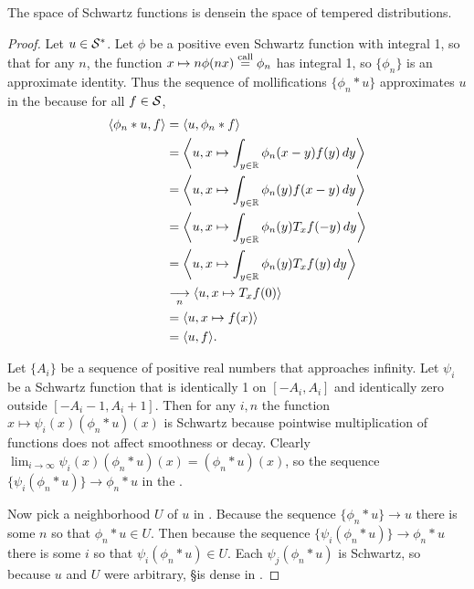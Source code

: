     \begin{thm}
      \label{thm:sdenseinss}
      The space of Schwartz functions is dense\footnotemark in the space of tempered distributions.
    \end{thm}
    \begin{proof}
      Let $u\in\SS$.
      Let $\phi$ be a positive even Schwartz function with integral 1, so that for any $n$, the function $x\mapsto n\phi(nx) \call \phi_n$ has integral 1, so $\{\phi_n\}$ is an approximate identity.
      Thus the sequence of mollifications $\{\phi_n*u\}$ approximates $u$ in the \ws because for all $f\in\S$, 
      \begin{align*}
        \langle \phi_n*u, f\rangle
        &= \langle u, \phi_n*f\rangle
        \\&= \left\langle u, x\mapsto \int_{y\in\R} \phi_n(x-y)f(y)\,dy \right\rangle
        \\&= \left\langle u, x\mapsto \int_{y\in\R} \phi_n(y)f(x-y)\,dy \right\rangle
        \\&= \left\langle u, x\mapsto \int_{y\in\R} \phi_n(y)T_xf(-y)\,dy \right\rangle
        \\&= \left\langle u, x\mapsto \int_{y\in\R} \phi_n(y)T_xf(y)\,dy \right\rangle
        \\&\underset{n}{\longrightarrow} \left\langle u, x\mapsto T_xf(0) \right\rangle
        \\&= \left\langle u, x\mapsto f(x) \right\rangle
        \\&= \langle u,f\rangle \text{.}
      \end{align*}

      Let $\{A_i\}$ be a sequence of positive real numbers that approaches infinity.
      Let $\psi_i$ be a Schwartz function that is identically 1 on $[-A_i,A_i]$ and identically zero outside $[-A_i-1,A_i+1]$.
      Then for any $i,n$ the function $x\mapsto\psi_i(x)(\phi_n*u)(x)$ is Schwartz because pointwise multiplication of functions does not affect smoothness or decay. 
      Clearly $\lim_{i\rightarrow\infty}\psi_i(x)(\phi_n*u)(x)=(\phi_n*u)(x)$, so the sequence $\{\psi_i(\phi_n*u)\}\rightarrow\phi_n*u$ in the \ws.

      Now pick a neighborhood $U$ of $u$ in \SS.
      Because the sequence $\{\phi_n*u\}\rightarrow u$ there is some $n$ so that $\phi_n*u\in U$.
      Then because the sequence $\{\psi_i(\phi_n*u)\}\rightarrow\phi_n*u$ there is some $i$ so that $\psi_i(\phi_n*u)\in U$.
      Each $\psi_j(\phi_n*u)$ is Schwartz, so because $u$ and $U$ were arbitrary, \S is dense in \SS.
    \end{proof}


